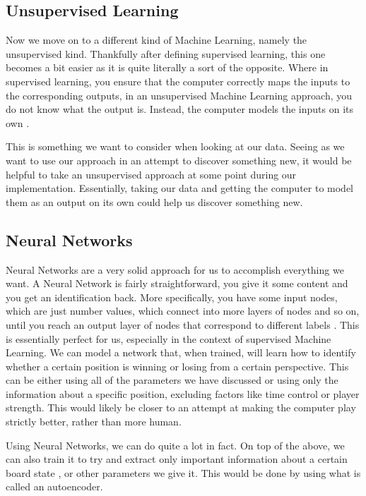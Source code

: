 \documentclass[12pt]{article}
\begin{document}
    \subsection{Unsupervised Learning}

    Now we move on to a different kind of Machine Learning, namely the unsupervised kind. Thankfully after defining supervised learning, this one becomes a bit easier as it is quite literally a sort of the opposite. Where in supervised learning, you ensure that the computer correctly maps the inputs to the corresponding outputs, in an unsupervised Machine Learning approach, you do not know what the output is. Instead, the computer models the inputs on its own \cite{mltypes_book}.

    This is something we want to consider when looking at our data. Seeing as we want to use our approach in an attempt to discover something new, it would be helpful to take an unsupervised approach at some point during our implementation. Essentially, taking our data and getting the computer to model them as an output on its own could help us discover something new.

    \subsection{Neural Networks}

    Neural Networks are a very solid approach for us to accomplish everything we want. A Neural Network is fairly straightforward, you give it some content and you get an identification back. More specifically, you have some input nodes, which are just number values, which connect into more layers of nodes and so on, until you reach an output layer of nodes that correspond to different labels \cite{nn_models_theory_projects}. This is essentially perfect for us, especially in the context of supervised Machine Learning. We can model a network that, when trained, will learn how to identify whether a certain position is winning or losing from a certain perspective. This can be either using all of the parameters we have discussed or using only the information about a specific position, excluding factors like time control or player strength. This would likely be closer to an attempt at making the computer play strictly better, rather than more human.

    Using Neural Networks, we can do quite a lot in fact. On top of the above, we can also train it to try and extract only important information about a certain board state \cite{deepchess}, or other parameters we give it. This would be done by using what is called an autoencoder.
\end{document}
